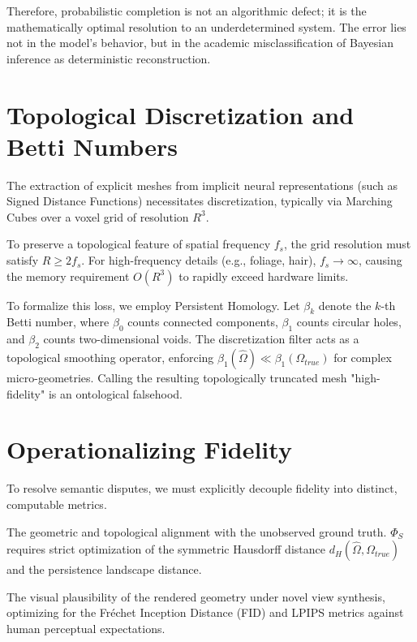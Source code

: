 \documentclass[10pt,journal,compsoc]{IEEEtran}
\begin{document}
Therefore, probabilistic completion is not an algorithmic defect; it is the mathematically optimal resolution to an underdetermined system. The error lies not in the model's behavior, but in the academic misclassification of Bayesian inference as deterministic reconstruction.

\section{Topological Discretization and Betti Numbers}
The extraction of explicit meshes from implicit neural representations (such as Signed Distance Functions) necessitates discretization, typically via Marching Cubes over a voxel grid of resolution $R^3$.

\begin{lemma}
To preserve a topological feature of spatial frequency $f_s$, the grid resolution must satisfy $R \ge 2f_s$. For high-frequency details (e.g., foliage, hair), $f_s \to \infty$, causing the memory requirement $O(R^3)$ to rapidly exceed hardware limits.
\end{lemma}

To formalize this loss, we employ Persistent Homology. Let $\beta_k$ denote the $k$-th Betti number, where $\beta_0$ counts connected components, $\beta_1$ counts circular holes, and $\beta_2$ counts two-dimensional voids. The discretization filter acts as a topological smoothing operator, enforcing $\beta_1(\hat{\Omega}) \ll \beta_1(\Omega_{true})$ for complex micro-geometries. Calling the resulting topologically truncated mesh "high-fidelity" is an ontological falsehood.

\section{Operationalizing Fidelity}
To resolve semantic disputes, we must explicitly decouple fidelity into distinct, computable metrics.

\begin{definition}
The geometric and topological alignment with the unobserved ground truth. $\Phi_S$ requires strict optimization of the symmetric Hausdorff distance $d_H(\hat{\Omega}, \Omega_{true})$ and the persistence landscape distance.
\end{definition}

\begin{definition}
The visual plausibility of the rendered geometry under novel view synthesis, optimizing for the Fréchet Inception Distance (FID) and LPIPS metrics against human perceptual expectations.
\end{definition}
\end{document}
